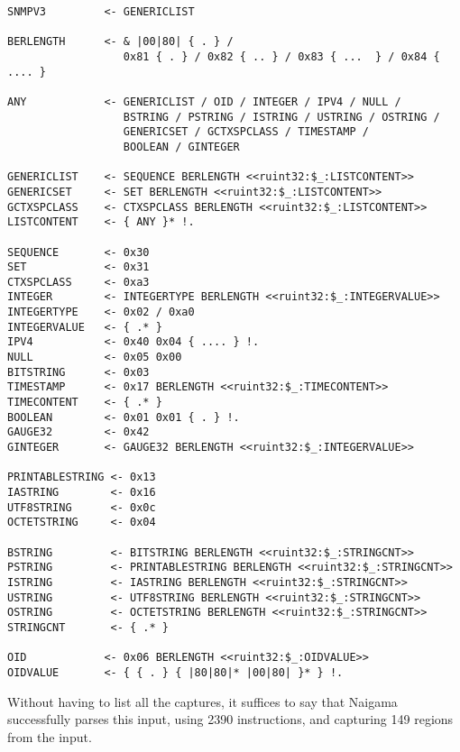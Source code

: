 \begin{changemargin}{-60mm}{0mm}
\begin{myquote}
\begin{verbatim}
SNMPV3         <- GENERICLIST

BERLENGTH      <- & |00|80| { . } /
                  0x81 { . } / 0x82 { .. } / 0x83 { ...  } / 0x84 { .... }

ANY            <- GENERICLIST / OID / INTEGER / IPV4 / NULL /
                  BSTRING / PSTRING / ISTRING / USTRING / OSTRING /
                  GENERICSET / GCTXSPCLASS / TIMESTAMP /
                  BOOLEAN / GINTEGER

GENERICLIST    <- SEQUENCE BERLENGTH <<ruint32:$_:LISTCONTENT>>
GENERICSET     <- SET BERLENGTH <<ruint32:$_:LISTCONTENT>>
GCTXSPCLASS    <- CTXSPCLASS BERLENGTH <<ruint32:$_:LISTCONTENT>>
LISTCONTENT    <- { ANY }* !.

SEQUENCE       <- 0x30
SET            <- 0x31
CTXSPCLASS     <- 0xa3
INTEGER        <- INTEGERTYPE BERLENGTH <<ruint32:$_:INTEGERVALUE>>
INTEGERTYPE    <- 0x02 / 0xa0
INTEGERVALUE   <- { .* }
IPV4           <- 0x40 0x04 { .... } !.
NULL           <- 0x05 0x00
BITSTRING      <- 0x03
TIMESTAMP      <- 0x17 BERLENGTH <<ruint32:$_:TIMECONTENT>>
TIMECONTENT    <- { .* }
BOOLEAN        <- 0x01 0x01 { . } !.
GAUGE32        <- 0x42
GINTEGER       <- GAUGE32 BERLENGTH <<ruint32:$_:INTEGERVALUE>>

PRINTABLESTRING <- 0x13
IASTRING        <- 0x16
UTF8STRING      <- 0x0c
OCTETSTRING     <- 0x04

BSTRING         <- BITSTRING BERLENGTH <<ruint32:$_:STRINGCNT>>
PSTRING         <- PRINTABLESTRING BERLENGTH <<ruint32:$_:STRINGCNT>>
ISTRING         <- IASTRING BERLENGTH <<ruint32:$_:STRINGCNT>>
USTRING         <- UTF8STRING BERLENGTH <<ruint32:$_:STRINGCNT>>
OSTRING         <- OCTETSTRING BERLENGTH <<ruint32:$_:STRINGCNT>>
STRINGCNT       <- { .* }

OID            <- 0x06 BERLENGTH <<ruint32:$_:OIDVALUE>>
OIDVALUE       <- { { . } { |80|80|* |00|80| }* } !.
\end{verbatim}
\end{myquote}
\end{changemargin}

Without having to list all the captures, it suffices to say that Naigama 
successfully parses this input, using 2390 instructions, and capturing 149 
regions from the input.
